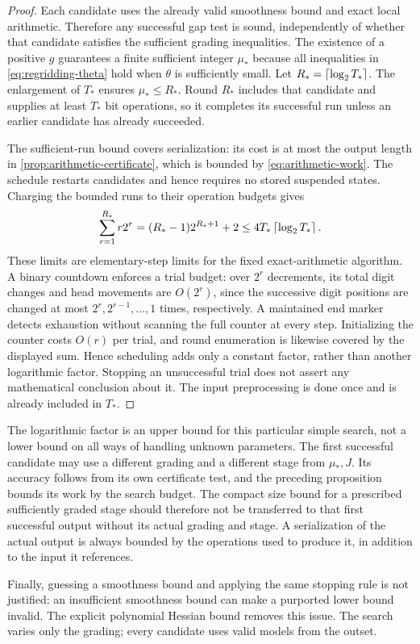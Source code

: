 \begin{proof}
Each candidate uses the already valid smoothness bound and exact local
arithmetic.  Therefore any successful gap test is sound, independently of
whether that candidate satisfies the sufficient grading inequalities.
The existence of a positive $g$ guarantees a finite sufficient integer
$\mu_*$ because all inequalities in \cref{eq:regridding-theta} hold when
$\theta$ is sufficiently small.  Let
$R_* = \left\lceil \log_2 T_*\right\rceil$.  The enlargement of $T_*$ ensures
$\mu_*\le R_*$.  Round $R_*$ includes that candidate and supplies at least
$T_*$ bit operations, so it completes its successful run unless an earlier
candidate has already succeeded.

The sufficient-run bound covers serialization: its cost is at most the
output length in \cref{prop:arithmetic-certificate}, which is bounded by
\cref{eq:arithmetic-work}. The schedule restarts candidates and hence
requires no stored suspended states. Charging the bounded runs to their
operation budgets gives
\[
 \sum_{r=1}^{R_*}r2^r
 =(R_*-1)2^{R_*+1}+2
 \le 4T_*\left\lceil \log_2 T_*\right\rceil.
\]
These limits are elementary-step limits for the fixed exact-arithmetic
algorithm.  A binary countdown enforces a trial budget: over $2^r$
decrements, its total digit changes and head movements are $O(2^r)$,
since the successive digit positions are changed at most
$2^r,2^{r-1},\ldots,1$ times, respectively.  A maintained end marker detects
exhaustion without scanning the full counter at every step.  Initializing
the counter costs $O(r)$ per trial, and round enumeration is likewise
covered by the displayed sum.  Hence scheduling adds only a constant
factor, rather than another logarithmic factor.  Stopping an unsuccessful trial
does not assert any mathematical conclusion about it.  The input
preprocessing is done once and is already included in $T_*$.
\end{proof}

The logarithmic factor is an upper bound for this particular simple search,
not a lower bound on all ways of handling unknown parameters.  The first
successful candidate may use a different grading and a different stage
from $\mu_*,J$.  Its accuracy follows from its own certificate test, and
the preceding proposition bounds its work by the search budget.  The compact
size bound for a prescribed sufficiently graded stage should therefore not
be transferred to that first successful output without its actual grading
and stage.  A serialization of the actual output is always bounded by the
operations used to produce it, in addition to the input it references.

Finally, guessing a smoothness bound and applying the same stopping rule is
not justified: an insufficient smoothness bound can make a purported lower
bound invalid.  The explicit polynomial Hessian bound removes this issue.
The search varies only the grading; every candidate uses valid models from
the outset.
